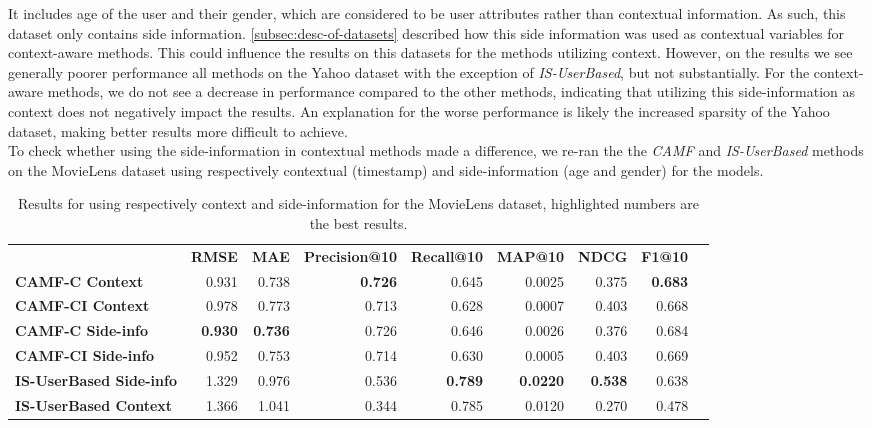 It includes age of the user and their gender, which are considered to be user attributes rather than contextual information.
As such, this dataset only contains side information.
\autoref{subsec:desc-of-datasets} described how this side information was used as contextual variables for context-aware methods.
This could influence the results on this datasets for the methods utilizing context.
However, on the results we see generally poorer performance all methods on the Yahoo dataset with the exception of \textit{IS-UserBased}, but not substantially.
For the context-aware methods, we do not see a decrease in performance compared to the other methods, indicating that utilizing this side-information as context does not negatively impact the results.
An explanation for the worse performance is likely the increased sparsity of the Yahoo dataset, making better results more difficult to achieve.\\
To check whether using the side-information in contextual methods made a difference, we re-ran the the \textit{CAMF} and \textit{IS-UserBased} methods on the MovieLens dataset using respectively contextual (timestamp) and side-information (age and gender) for the models.
\begin{table*}[!htp]\centering
    \caption{Results for using respectively context and side-information for the MovieLens dataset, highlighted numbers are the best results.}\label{tab:movielenscontextsideinfo}
    \scriptsize
    \begin{tabular}{lrrrrrrrr}\toprule
    &\textbf{RMSE} &\textbf{MAE} &\textbf{Precision@10} &\textbf{Recall@10} &\textbf{MAP@10} &\textbf{NDCG} &\textbf{F1@10} \\\cmidrule{2-8}
    \textbf{CAMF-C Context} &0.931 &0.738 &\textbf{0.726} &0.645 &0.0025 &0.375 &\textbf{0.683} \\\cmidrule{1-8}
    \textbf{CAMF-CI Context} &0.978 &0.773 &0.713 &0.628 &0.0007 &0.403 &0.668 \\\cmidrule{1-8}
    \textbf{CAMF-C Side-info} &\textbf{0.930} &\textbf{0.736} &0.726 &0.646 &0.0026 &0.376 &0.684 \\\cmidrule{1-8}
    \textbf{CAMF-CI Side-info} &0.952 &0.753 &0.714 &0.630 &0.0005 &0.403 &0.669 \\\cmidrule{1-8}
    \textbf{IS-UserBased Side-info} &1.329 &0.976 &0.536 &\textbf{0.789} &\textbf{0.0220} &\textbf{0.538} &0.638 \\\cmidrule{1-8}
    \textbf{IS-UserBased Context} &1.366 &1.041 &0.344 &0.785 &0.0120 &0.270 &0.478 \\\cmidrule{1-8}
    \bottomrule
    \end{tabular}
\end{table*}
